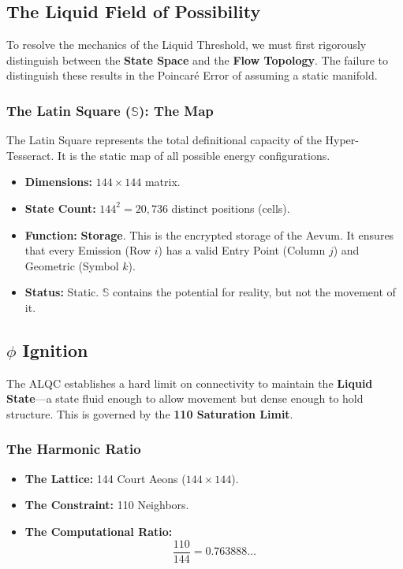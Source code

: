 \documentclass[12pt]{amsart}
\begin{document}
\subsection{The Liquid Field of Possibility}\label{appendixF.1}

To resolve the mechanics of the Liquid Threshold, we must first rigorously distinguish between the \textbf{State Space} and the \textbf{Flow Topology}. The failure to distinguish these results in the Poincaré Error of assuming a static manifold.

\subsubsection{The Latin Square (\protect\boldmath$\mathbb{S}$): The Map}\label{appendixF.1.1}
The Latin Square represents the total definitional capacity of the Hyper-Tesseract. It is the static map of all possible energy configurations.

\begin{itemize}
    \item \textbf{Dimensions:} $144 \times 144$ matrix.
    \item \textbf{State Count:} $144^2 = 20,736$ distinct positions (cells).
    \item \textbf{Function:} \textbf{Storage}. This is the encrypted storage of the Aevum. It ensures that every Emission (Row $i$) has a valid Entry Point (Column $j$) and Geometric (Symbol $k$).
    \item \textbf{Status:} Static. $\mathbb{S}$ contains the potential for reality, but not the movement of it.
\end{itemize}

\subsection[Phi Ignition]{$\phi$ Ignition}\label{appendixF.2}

The ALQC establishes a hard limit on connectivity to maintain the \textbf{Liquid State}---a state fluid enough to allow movement but dense enough to hold structure. This is governed by the \textbf{110 Saturation Limit}.

\subsubsection{The Harmonic Ratio}\label{appendixF.2.1}  
\begin{itemize}
    \item \textbf{The Lattice:} 144 Court Aeons ($144 \times 144$).
    \item \textbf{The Constraint:} 110 Neighbors.
    \item \textbf{The Computational Ratio:}
    \begin{equation}
        \frac{110}{144} = 0.763888\dots
    \end{equation}
\end{itemize}
\end{document}
